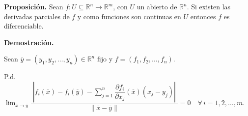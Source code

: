 \documentclass[fleqn]{article}
\begin{document}
    \textbf{Proposición.} Sean $ f: U \subseteq \mathbb{R}^n \to \mathbb{R}^m $, con $ U $ un abierto de $ \mathbb{R}^n $. Si existen las derivadas parciales de $ f $ y como funciones son continuas en $ U $ entonces $ f $ es diferenciable.

    \textbf{Demostración.}

    Sean $ \overline{y} = \left( y_1, y_2, \ldots, y_n \right) \in \mathbb{R}^n $ fijo y $ f = \left( f_1, f_2, \ldots, f_n \right) $.

    P.d. $ \displaystyle \lim_{\overline{x} \to \overline{y}} \dfrac{ \phantom{|} \left\lvert f_i(\overline{x}) - f_i(\overline{y}) - \displaystyle \sum_{j=1}^{n} \dfrac{ \partial f_i }{ \partial x_j } (\overline{x}) \left( x_j - y_j \right) \right\rvert \phantom{|} }{ \left\lVert \overline{x} - \overline{y} \right\rVert } = 0 \quad \forall \, i = 1, 2, \ldots, m $.
\end{document}
